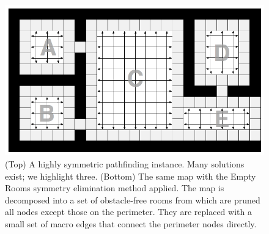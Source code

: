 \begin{figure}[tb]
       \begin{center}
                       \includegraphics[scale=0.30, trim = 10mm 10mm 10mm 0mm]{diagrams/overview.png}
       \end{center}
	\vspace{-3pt}
       \caption{(Top) A highly symmetric pathfinding instance. Many solutions exist; we highlight three. 
				(Bottom) The same map with the Empty Rooms symmetry elimination method applied. 
				The map is decomposed into a set of obstacle-free rooms from which are pruned all nodes except those on the perimeter.
				They are replaced with a small set of macro edges that connect the perimeter nodes directly.}
       \label{fig-overview}
\end{figure}
